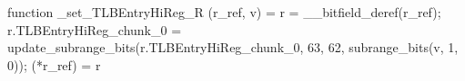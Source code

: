 function _set_TLBEntryHiReg_R (r_ref, v) = {
    r = __bitfield_deref(r_ref);
    r.TLBEntryHiReg_chunk_0 = update_subrange_bits(r.TLBEntryHiReg_chunk_0, 63, 62, subrange_bits(v, 1, 0));
    (*r_ref) = r
}
